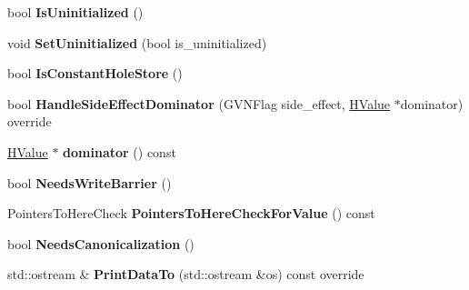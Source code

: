 \begin{DoxyCompactItemize}
\item 
bool {\bfseries Is\+Uninitialized} ()\hypertarget{classv8_1_1internal_1_1_h_store_keyed_a96e3f2ab96f58f901f4253cd99cf2f81}{}\label{classv8_1_1internal_1_1_h_store_keyed_a96e3f2ab96f58f901f4253cd99cf2f81}

\item 
void {\bfseries Set\+Uninitialized} (bool is\+\_\+uninitialized)\hypertarget{classv8_1_1internal_1_1_h_store_keyed_a9c85b02845994e0e5e23b8a2741e5a68}{}\label{classv8_1_1internal_1_1_h_store_keyed_a9c85b02845994e0e5e23b8a2741e5a68}

\item 
bool {\bfseries Is\+Constant\+Hole\+Store} ()\hypertarget{classv8_1_1internal_1_1_h_store_keyed_abbeb58c8bf487f6d7378a4c7f0dbf6b1}{}\label{classv8_1_1internal_1_1_h_store_keyed_abbeb58c8bf487f6d7378a4c7f0dbf6b1}

\item 
bool {\bfseries Handle\+Side\+Effect\+Dominator} (G\+V\+N\+Flag side\+\_\+effect, \hyperlink{classv8_1_1internal_1_1_h_value}{H\+Value} $\ast$dominator) override\hypertarget{classv8_1_1internal_1_1_h_store_keyed_a4edbd2ccee073aa06662223702e3a70f}{}\label{classv8_1_1internal_1_1_h_store_keyed_a4edbd2ccee073aa06662223702e3a70f}

\item 
\hyperlink{classv8_1_1internal_1_1_h_value}{H\+Value} $\ast$ {\bfseries dominator} () const \hypertarget{classv8_1_1internal_1_1_h_store_keyed_ab5d9a63e503a07a78aafe947dba95b01}{}\label{classv8_1_1internal_1_1_h_store_keyed_ab5d9a63e503a07a78aafe947dba95b01}

\item 
bool {\bfseries Needs\+Write\+Barrier} ()\hypertarget{classv8_1_1internal_1_1_h_store_keyed_af4e9acfb8376778b85dd8d8628ed2fea}{}\label{classv8_1_1internal_1_1_h_store_keyed_af4e9acfb8376778b85dd8d8628ed2fea}

\item 
Pointers\+To\+Here\+Check {\bfseries Pointers\+To\+Here\+Check\+For\+Value} () const \hypertarget{classv8_1_1internal_1_1_h_store_keyed_a04ad7f159810d23c653f4fbce227e6cf}{}\label{classv8_1_1internal_1_1_h_store_keyed_a04ad7f159810d23c653f4fbce227e6cf}

\item 
bool {\bfseries Needs\+Canonicalization} ()\hypertarget{classv8_1_1internal_1_1_h_store_keyed_a27ff7cd1052f0f7fc605a235d725731e}{}\label{classv8_1_1internal_1_1_h_store_keyed_a27ff7cd1052f0f7fc605a235d725731e}

\item 
std\+::ostream \& {\bfseries Print\+Data\+To} (std\+::ostream \&os) const  override\hypertarget{classv8_1_1internal_1_1_h_store_keyed_aec5c57e24ad1af4fe1795c5ec64cfd05}{}\label{classv8_1_1internal_1_1_h_store_keyed_aec5c57e24ad1af4fe1795c5ec64cfd05}

\end{DoxyCompactItemize}
